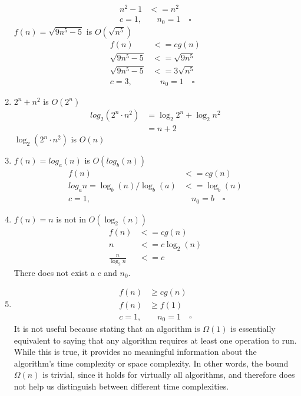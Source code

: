 \begin{enumerate}
\begin{align*}
      n^2 - 1 &<= n^2 \\
      c = 1, & \quad n_0 = 1 \quad \square
    \end{align*}
    $f(n) = \sqrt{9n^{5}-5}$ is $O(\sqrt{n^{5}})$
    \begin{align*}
      f(n) &<= cg(n) \\
      \sqrt{9n^5-5} &<= \sqrt{9n^5} \\
      \sqrt{9n^5-5} &<= 3\sqrt{n^5} \\
      c = 3, &\quad n_0 = 1 \quad \square
    \end{align*}
  \item $2^n + n^2$ is $O(2^n)$
    \begin{align*}
      log_{2}(2^{n} \cdot n^{2}) &= \log_{2}{2^{n}} + \log_{2}{n^{2}} \\
      &= n + 2
    \end{align*}
    $\log_{2}(2^{n} \cdot n^{2})$ is $O(n)$
  \item $f(n) = log_{a}(n)$ is $O(log_{b}(n))$
    \begin{align*}
      f(n) &<= cg(n) \\
      log_{a}n = \log_{b}(n)/\log_{b}(a) &<= \log_{b}(n) \\ 
      c = 1, &\quad n_0 = b \quad \square
    \end{align*}
  \item $f(n) = n$ is not in $O(\log_{2}(n))$
    \begin{align*}
      f(n) &<= cg(n) \\
      n &<= c\log_{2}(n) \\
      \frac{n}{\log_2{n}} &<= c
    \end{align*}
    There does not exist a $c$ and $n_0$.
  \item
    \begin{align*}
      f(n) &\ge cg(n) \\
      f(n) &\ge f(1) \\
      c = 1, &\quad n_0 = 1 \quad \square
    \end{align*}
    It is not useful because stating that an algorithm is $\Omega(1)$ is essentially equivalent to saying that any algorithm requires at least one operation to run. While this is true, it provides no meaningful information about the algorithm’s time complexity or space complexity. In other words, the bound $\Omega(n)$ is trivial, since it holds for virtually all algorithms, and therefore does not help us distinguish between different time complexities.
\end{enumerate}
